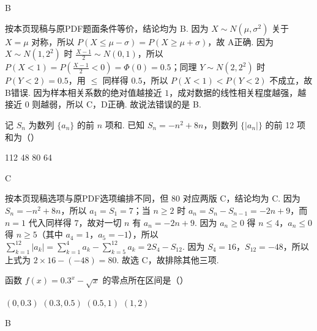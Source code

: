 \documentclass[UTF8,a4paper,oneside,11pt]{ctexbook}
\begin{document}
\begin{answer}
B
\end{answer}

\begin{solution}
按本页现稿与原PDF题面条件等价，结论均为 B. 因为 \(X\sim N\left( \mu,\sigma^{2} \right)\) 关于 \(X=\mu\) 对称，所以 \(P\left( X\le \mu-\sigma \right)=P\left( X\ge \mu+\sigma \right)\)，故 A正确. 因为 \(X\sim N\left( 1,2^{2} \right)\) 时 \(\frac{X-1}{2}\sim N\left( 0,1 \right)\)，所以 \(P\left( X<1 \right)=P\left( \frac{X-1}{2}<0 \right)=\Phi\left( 0 \right)=0.5\)；同理 \(Y\sim N\left( 2,2^{2} \right)\) 时 \(P\left( Y<2 \right)=0.5\)，用 \(\le\) 同样得 \(0.5\)，所以 \(P\left( X<1 \right)<P\left( Y<2 \right)\) 不成立，故 B错误. 因为样本相关系数的绝对值越接近 \(1\)，成对数据的线性相关程度越强，越接近 \(0\) 则越弱，所以 C，D正确. 故说法错误的是 B.
\end{solution}

\begin{problem}
记 \(S_n\) 为数列 \(\{a_n\}\) 的前 \(n\) 项和. 已知 \(S_n=-n^2+8n\)，则数列 \(\{|a_n|\}\) 的前 12 项和为（\quad）

\choices
    {112}
    {48}
    {80}
    {64}
\end{problem}

\begin{answer}
C
\end{answer}

\begin{solution}
按本页现稿选项与原PDF选项编排不同，但 \(80\) 对应两版 C，结论均为 C. 因为 \(S_{n}=-n^{2}+8n\)，所以 \(a_{1}=S_{1}=7\)；当 \(n\ge 2\) 时 \(a_{n}=S_{n}-S_{n-1}=-2n+9\)，而 \(n=1\) 代入同样得 \(7\)，故对一切 \(n\) 有 \(a_{n}=-2n+9\). 因为 \(a_{n}\ge 0\) 得 \(n\le 4\)，\(a_{n}\le 0\) 得 \(n\ge 5\)（其中 \(a_{4}=1\)，\(a_{5}=-1\)），所以 \(\sum_{k=1}^{12}\left| a_{k} \right|=\sum_{k=1}^{4}a_{k}-\sum_{k=5}^{12}a_{k}=2S_{4}-S_{12}\). 因为 \(S_{4}=16\)，\(S_{12}=-48\)，所以上式为 \(2\times 16-\left( -48 \right)=80\). 故选 C，故排除其他三项.
\end{solution}

\begin{problem}
函数 \(f(x)=0.3^x-\sqrt{x}\) 的零点所在区间是（\quad）

\choices
    {\((0,0.3)\)}
    {\((0.3,0.5)\)}
    {\((0.5,1)\)}
    {\((1,2)\)}
\end{problem}

\begin{answer}
B
\end{answer}
\end{document}
